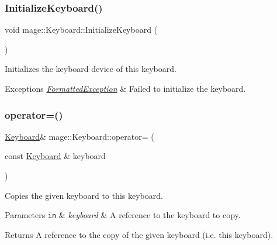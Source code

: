 \subsubsection{\texorpdfstring{Initialize\+Keyboard()}{InitializeKeyboard()}}
{\footnotesize\ttfamily void mage\+::\+Keyboard\+::\+Initialize\+Keyboard (\begin{DoxyParamCaption}{ }\end{DoxyParamCaption})\hspace{0.3cm}{\ttfamily [private]}}

Initializes the keyboard device of this keyboard.


\begin{DoxyExceptions}{Exceptions}
{\em \hyperlink{structmage_1_1_formatted_exception}{Formatted\+Exception}} & Failed to initialize the keyboard. \\
\hline
\end{DoxyExceptions}
\hypertarget{classmage_1_1_keyboard_ae3ba98190c8c14ea894c676888825f35}{}\label{classmage_1_1_keyboard_ae3ba98190c8c14ea894c676888825f35} 
\subsubsection{\texorpdfstring{operator=()}{operator=()}\hspace{0.1cm}{\footnotesize\ttfamily [1/2]}}
{\footnotesize\ttfamily \hyperlink{classmage_1_1_keyboard}{Keyboard}\& mage\+::\+Keyboard\+::operator= (\begin{DoxyParamCaption}\item[{const \hyperlink{classmage_1_1_keyboard}{Keyboard} \&}]{keyboard }\end{DoxyParamCaption})\hspace{0.3cm}{\ttfamily [delete]}}

Copies the given keyboard to this keyboard.


\begin{DoxyParams}[1]{Parameters}
\mbox{\tt in}  & {\em keyboard} & A reference to the keyboard to copy. \\
\hline
\end{DoxyParams}
\begin{DoxyReturn}{Returns}
A reference to the copy of the given keyboard (i.\+e. this keyboard). 
\end{DoxyReturn}
\hypertarget{classmage_1_1_keyboard_a4f381bc90cc6828b4d0313999b544e6e}{}\label{classmage_1_1_keyboard_a4f381bc90cc6828b4d0313999b544e6e} 
